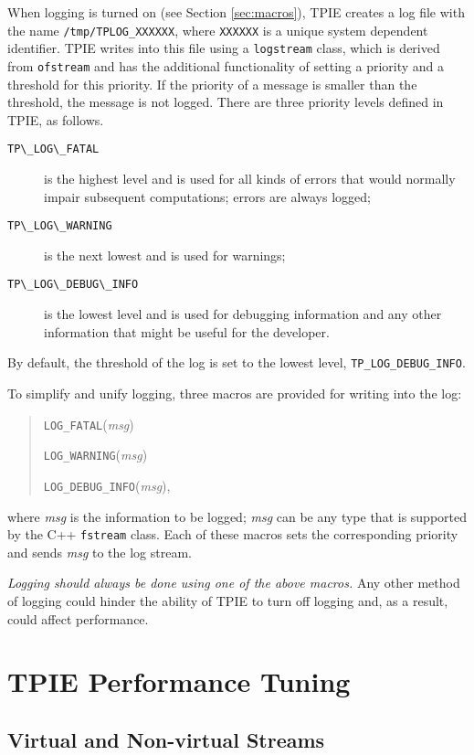 When logging is turned on (see Section \ref{sec:macros}), TPIE creates a log file with the name \verb|/tmp/TPLOG_XXXXXX|, where \verb|XXXXXX| is a unique system dependent identifier. TPIE writes into this file using a \verb|logstream| class, which is derived from \verb|ofstream| and has the additional functionality of setting a priority and a threshold for this priority. If the priority of a message is smaller than the threshold, the message is not logged. There are three priority levels defined in TPIE, as follows.
\begin{description}
\item[\verb|TP\_LOG\_FATAL|] is the highest level and is used for all kinds of errors that would normally impair subsequent computations; errors are always logged;
\item[\verb|TP\_LOG\_WARNING|] is the next lowest and is used for warnings;
\item[\verb|TP\_LOG\_DEBUG\_INFO|] is the lowest level and is used for debugging information and any other information that might be useful for the developer.
\end{description}
By default, the threshold of the log is set to the lowest level, \verb|TP_LOG_DEBUG_INFO|.

To simplify and unify logging, three macros are provided for writing into the log: 
\begin{quote}
\verb|LOG_FATAL|({\em msg})

\verb|LOG_WARNING|({\em msg})

\verb|LOG_DEBUG_INFO|({\em msg}),
\end{quote}
where {\em msg} is the information to be logged; {\em msg} can be any type that is supported by the C++ \verb|fstream| class. Each of these macros sets the corresponding priority and sends {\em msg} to the log stream.

{\em Logging should always be done using one of the above macros.} Any other method of logging could hinder the ability of TPIE to turn off logging and, as a result, could affect performance.


\chapter{TPIE Performance Tuning}

\section{Virtual and Non-virtual Streams}



